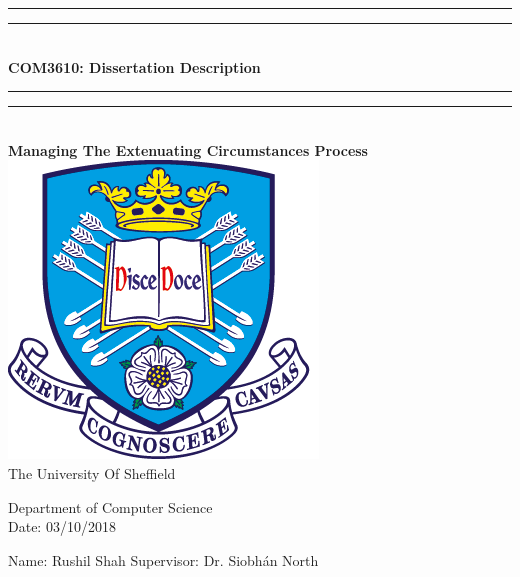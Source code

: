 \documentclass[12pt]{article}
\begin{document}
\thispagestyle{empty}
\begin{center}
\rule[0.5ex]{\linewidth}{2pt}\vspace*{-\baselineskip}\vspace*{3.2pt}
\rule[0.5ex]{\linewidth}{1pt}\\[\baselineskip]

\textbf{ {\LARGE COM3610: Dissertation Description}}\\[4mm]

\rule[0.5ex]{\linewidth}{1pt}\vspace*{-\baselineskip}\vspace{3.2pt}
\rule[0.5ex]{\linewidth}{2pt}\\[4mm]

\textbf{{\large Managing The Extenuating Circumstances Process}}\\[20mm]


\includegraphics[scale=2]{images/TuosLogo.png}\\[8mm]

{\LARGE The University Of Sheffield}\\[2mm]

\begin{large}
Department of Computer Science\\[2mm]

Date: 03/10/2018\\[20mm]
\end{large}

\end{center}

\begin{large}
Name: Rushil Shah 
\hfill
Supervisor: Dr. Siobhán North
\end{large}





\end{document}
